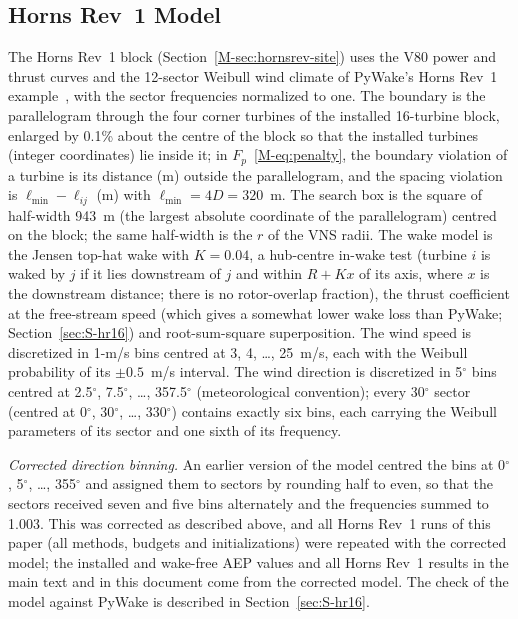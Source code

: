 \documentclass[10pt]{article}
\begin{document}
\subsection{Horns Rev~1 Model}
\label{sec:S-hrmodel}
The Horns Rev~1 block (Section~\ref{M-sec:hornsrev-site}) uses the V80 power and thrust curves and the 12-sector Weibull wind climate of PyWake's Horns Rev~1 example~\cite{PyWake}, with the sector frequencies normalized to one. The boundary is the parallelogram through the four corner turbines of the installed 16-turbine block, enlarged by 0.1\% about the centre of the block so that the installed turbines (integer coordinates) lie inside it; in $F_p$~\eqref{M-eq:penalty}, the boundary violation of a turbine is its distance (m) outside the parallelogram, and the spacing violation is $\ell_{\min}-\ell_{ij}$ (m) with $\ell_{\min}=4D=320$~m. The search box is the square of half-width 943~m (the largest absolute coordinate of the parallelogram) centred on the block; the same half-width is the $r$ of the VNS radii. The wake model is the Jensen top-hat wake with $K=0.04$, a hub-centre in-wake test (turbine $i$ is waked by $j$ if it lies downstream of $j$ and within $R+Kx$ of its axis, where $x$ is the downstream distance; there is no rotor-overlap fraction), the thrust coefficient at the free-stream speed (which gives a somewhat lower wake loss than PyWake; Section~\ref{sec:S-hr16}) and root-sum-square superposition. The wind speed is discretized in 1-m/s bins centred at 3, 4, \ldots, 25~m/s, each with the Weibull probability of its $\pm0.5$~m/s interval. The wind direction is discretized in 5$^\circ$ bins centred at 2.5$^\circ$, 7.5$^\circ$, \ldots, 357.5$^\circ$ (meteorological convention); every 30$^\circ$ sector (centred at 0$^\circ$, 30$^\circ$, \ldots, 330$^\circ$) contains exactly six bins, each carrying the Weibull parameters of its sector and one sixth of its frequency.

\emph{Corrected direction binning.} An earlier version of the model centred the bins at 0$^\circ$, 5$^\circ$, \ldots, 355$^\circ$ and assigned them to sectors by rounding half to even, so that the sectors received seven and five bins alternately and the frequencies summed to 1.003. This was corrected as described above, and all Horns Rev~1 runs of this paper (all methods, budgets and initializations) were repeated with the corrected model; the installed and wake-free AEP values and all Horns Rev~1 results in the main text and in this document come from the corrected model. The check of the model against PyWake is described in Section~\ref{sec:S-hr16}.
\end{document}
